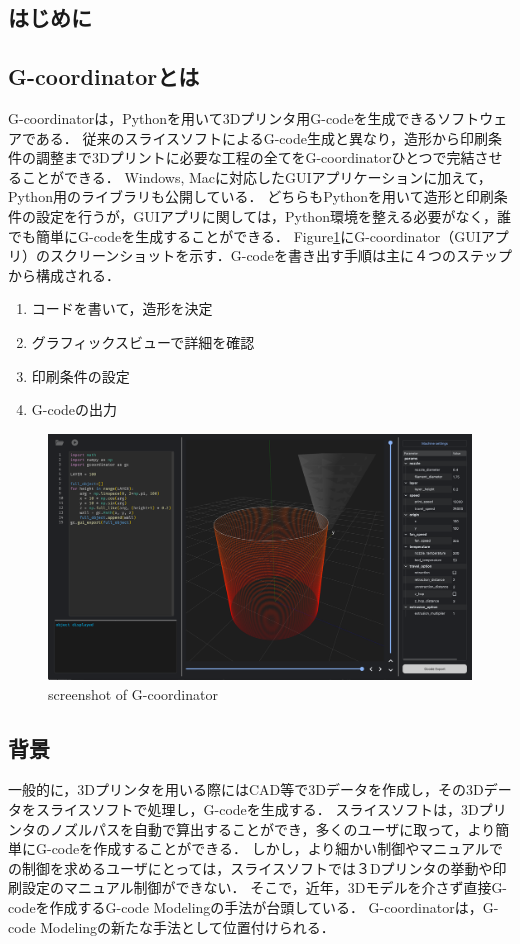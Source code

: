 \documentclass{article}
\begin{document}
\begin{twocolumn}

\section{はじめに}
\subsection{G-coordinatorとは}
G-coordinatorは，Pythonを用いて3Dプリンタ用G-codeを生成できるソフトウェアである．
従来のスライスソフトによるG-code生成と異なり，造形から印刷条件の調整まで3Dプリントに必要な工程の全てをG-coordinatorひとつで完結させることができる．
Windows, Macに対応したGUIアプリケーションに加えて，Python用のライブラリも公開している．
どちらもPythonを用いて造形と印刷条件の設定を行うが，GUIアプリに関しては，Python環境を整える必要がなく，誰でも簡単にG-codeを生成することができる．
Figure\ref{fig:1}にG-coordinator（GUIアプリ）のスクリーンショットを示す．G-codeを書き出す手順は主に４つのステップから構成される．
\begin{enumerate}
  \item コードを書いて，造形を決定
  \item グラフィックスビューで詳細を確認
  \item 印刷条件の設定
  \item G-codeの出力
\end{enumerate}

\begin{figure}[h]
  \includegraphics[width=\linewidth]{img/screenshot.png}
  \caption{screenshot of G-coordinator}
  \label{fig:1}
\end{figure}
  
\subsection{背景}
一般的に，3Dプリンタを用いる際にはCAD等で3Dデータを作成し，その3Dデータをスライスソフトで処理し，G-codeを生成する．
スライスソフトは，3Dプリンタのノズルパスを自動で算出することができ，多くのユーザに取って，より簡単にG-codeを作成することができる．
しかし，より細かい制御やマニュアルでの制御を求めるユーザにとっては，スライスソフトでは３Dプリンタの挙動や印刷設定のマニュアル制御ができない．
そこで，近年，3Dモデルを介さず直接G-codeを作成するG-code Modeling\cite{chinen_thesis}の手法が台頭している．
G-coordinatorは，G-code Modelingの新たな手法として位置付けられる．


\end{twocolumn}
\end{document}

